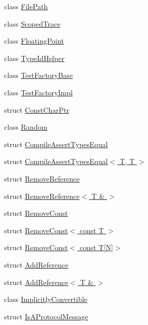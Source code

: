 \begin{DoxyCompactItemize}
\item 
class \hyperlink{classtesting_1_1internal_1_1FilePath}{File\-Path}
\item 
class \hyperlink{classtesting_1_1internal_1_1ScopedTrace}{Scoped\-Trace}
\item 
class \hyperlink{classtesting_1_1internal_1_1FloatingPoint}{Floating\-Point}
\item 
class \hyperlink{classtesting_1_1internal_1_1TypeIdHelper}{Type\-Id\-Helper}
\item 
class \hyperlink{classtesting_1_1internal_1_1TestFactoryBase}{Test\-Factory\-Base}
\item 
class \hyperlink{classtesting_1_1internal_1_1TestFactoryImpl}{Test\-Factory\-Impl}
\item 
struct \hyperlink{structtesting_1_1internal_1_1ConstCharPtr}{Const\-Char\-Ptr}
\item 
class \hyperlink{classtesting_1_1internal_1_1Random}{Random}
\item 
struct \hyperlink{structtesting_1_1internal_1_1CompileAssertTypesEqual}{Compile\-Assert\-Types\-Equal}
\item 
struct \hyperlink{structtesting_1_1internal_1_1CompileAssertTypesEqual_3_01T_00_01T_01_4}{Compile\-Assert\-Types\-Equal$<$ T, T $>$}
\item 
struct \hyperlink{structtesting_1_1internal_1_1RemoveReference}{Remove\-Reference}
\item 
struct \hyperlink{structtesting_1_1internal_1_1RemoveReference_3_01T_01_6_01_4}{Remove\-Reference$<$ T \& $>$}
\item 
struct \hyperlink{structtesting_1_1internal_1_1RemoveConst}{Remove\-Const}
\item 
struct \hyperlink{structtesting_1_1internal_1_1RemoveConst_3_01const_01T_01_4}{Remove\-Const$<$ const T $>$}
\item 
struct \hyperlink{structtesting_1_1internal_1_1RemoveConst_3_01const_01T[N]_4}{Remove\-Const$<$ const T\mbox{[}\-N\mbox{]}$>$}
\item 
struct \hyperlink{structtesting_1_1internal_1_1AddReference}{Add\-Reference}
\item 
struct \hyperlink{structtesting_1_1internal_1_1AddReference_3_01T_01_6_01_4}{Add\-Reference$<$ T \& $>$}
\item 
class \hyperlink{classtesting_1_1internal_1_1ImplicitlyConvertible}{Implicitly\-Convertible}
\item 
struct \hyperlink{structtesting_1_1internal_1_1IsAProtocolMessage}{Is\-A\-Protocol\-Message}

\end{DoxyCompactItemize}
